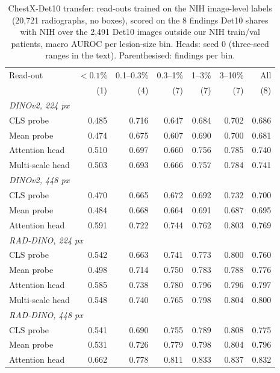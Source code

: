\documentclass[10pt,letterpaper,twocolumn]{article}
\begin{document}
\begin{table}[t]
\centering\footnotesize\setlength{\tabcolsep}{3.5pt}
\caption{ChestX-Det10 transfer: read-outs trained on the NIH image-level labels (20,721
radiographs, no boxes), scored on the 8 findings Det10 shares with NIH over the 2,491 Det10
images outside our NIH train/val patients, macro AUROC per lesion-size bin. Heads: seed 0
(three-seed ranges in the text). Parenthesised: findings per bin.}
\label{tab:det10t}
\begin{tabular}{lrrrrrr}
\toprule
Read-out & $<0.1\%$ & 0.1--0.3\% & 0.3--1\% & 1--3\% & 3--10\% & All \\
 & (1) & (4) & (7) & (7) & (7) & (8) \\
\midrule
\multicolumn{7}{l}{\emph{DINOv2, 224 px}} \\
CLS probe        & 0.485 & 0.716 & 0.647 & 0.684 & 0.702 & 0.686 \\
Mean probe       & 0.474 & 0.675 & 0.607 & 0.690 & 0.700 & 0.681 \\
Attention head   & 0.510 & 0.697 & 0.660 & 0.756 & 0.785 & 0.740 \\
Multi-scale head & 0.503 & 0.693 & 0.666 & 0.757 & 0.784 & 0.741 \\
\midrule
\multicolumn{7}{l}{\emph{DINOv2, 448 px}} \\
CLS probe        & 0.470 & 0.665 & 0.672 & 0.692 & 0.732 & 0.700 \\
Mean probe       & 0.484 & 0.668 & 0.664 & 0.691 & 0.687 & 0.695 \\
Attention head   & 0.591 & 0.722 & 0.744 & 0.762 & 0.803 & 0.769 \\
\midrule
\multicolumn{7}{l}{\emph{RAD-DINO, 224 px}} \\
CLS probe        & 0.542 & 0.663 & 0.741 & 0.773 & 0.800 & 0.760 \\
Mean probe       & 0.498 & 0.714 & 0.750 & 0.783 & 0.788 & 0.776 \\
Attention head   & 0.585 & 0.738 & 0.780 & 0.796 & 0.796 & 0.797 \\
Multi-scale head & 0.548 & 0.740 & 0.765 & 0.798 & 0.804 & 0.800 \\
\midrule
\multicolumn{7}{l}{\emph{RAD-DINO, 448 px}} \\
CLS probe        & 0.541 & 0.690 & 0.755 & 0.789 & 0.808 & 0.775 \\
Mean probe       & 0.531 & 0.726 & 0.779 & 0.798 & 0.804 & 0.796 \\
Attention head   & 0.662 & 0.778 & 0.811 & 0.833 & 0.837 & 0.832 \\
\bottomrule
\end{tabular}
\end{table}
\end{document}
